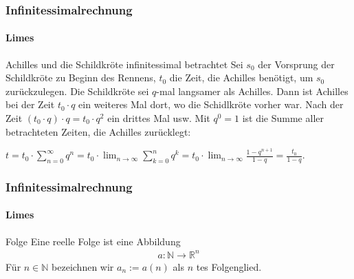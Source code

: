 \documentclass{beamer}
\begin{document}
\begin{frame}
    \frametitle{Infinitessimalrechnung}
\framesubtitle{Limes}
    \begin{block}{Achilles und die Schildkröte infinitessimal betrachtet}
Sei $s_0$ der Vorsprung der Schildkröte zu Beginn des Rennens, $t_0$ die Zeit, die Achilles benötigt, um $s_0$ zurückzulegen. Die Schildkröte sei $q$-mal langsamer als Achilles.
Dann ist Achilles  bei der Zeit $t_0 \cdot q$ ein weiteres Mal dort, wo die Schidlkröte vorher war. 
Nach der Zeit $(t_0 \cdot q) \cdot q = t_0 \cdot q^2$ ein drittes Mal usw.
Mit $q^0 = 1$ ist die Summe aller betrachteten Zeiten, die Achilles zurücklegt:

$t = t_0 \cdot \sum_{n=0}^\infty q^n = t_0 \cdot \lim_{n \to \infty} \sum_{k=0}^{n} q^{k} = t_0 \cdot \lim_{n \to \infty} \frac{1 - q^{n+1}}{1 -q} = \frac{t_0}{1 -q}$.
\end{block}
 \end{frame}






\begin{frame}
    \frametitle{Infinitessimalrechnung}
\framesubtitle{Limes}

\begin{block}{Folge}
    Eine reelle Folge ist eine Abbildung
    \begin{align*}
    a: \mathbb{N} \rightarrow \mathbb{R}^n
    \end{align*}
 Für $n \in \mathbb{N}$ bezeichnen wir $a_n := a(n)$ als $n$ tes Folgenglied.
\end{block}


 \end{frame}
\end{document}
